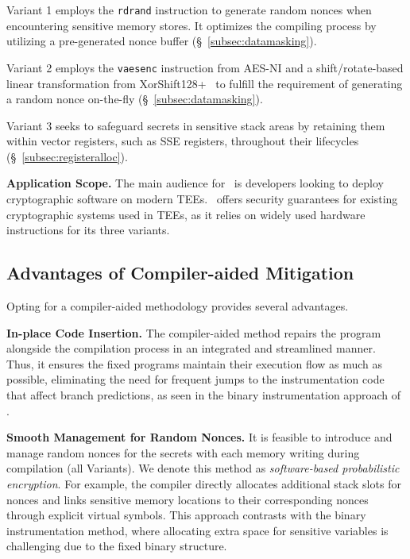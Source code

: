 \begin{packed_itemize}
    \item Variant 1 employs the \texttt{rdrand} instruction to generate random nonces when encountering sensitive memory stores. It optimizes the compiling process by utilizing a pre-generated nonce buffer (\S~\ref{subsec:datamasking}).
    
    \item Variant 2 employs the \texttt{vaesenc} instruction from AES-NI and a shift/rotate-based linear transformation from XorShift128+~\cite{vigna2017further} to fulfill the requirement of generating a random nonce on-the-fly (\S~\ref{subsec:datamasking}).
    
    \item Variant 3 seeks to safeguard secrets in sensitive stack areas by retaining them within vector registers, such as SSE registers, throughout their lifecycles (\S~\ref{subsec:registeralloc}).
\end{packed_itemize}

\noindent \textbf{Application Scope.}
The main audience for \tool\ is developers looking to deploy cryptographic software on modern TEEs. \tool\ offers security guarantees for existing cryptographic systems used in TEEs, as it relies on widely used hardware instructions for its three variants.

\subsection{Advantages of Compiler-aided Mitigation}
\label{subsec:advantages}

Opting for a compiler-aided methodology provides several advantages.

\noindent\textbf{In-place Code Insertion.}
The compiler-aided method repairs the program alongside the compilation process in an integrated and streamlined manner.
Thus, it ensures the fixed programs maintain their execution flow as much as possible, eliminating the need for frequent jumps to the instrumentation code that affect branch predictions, as seen in the binary instrumentation approach of \ftool.

\noindent\textbf{Smooth Management for Random Nonces.}
It is feasible to introduce and manage random nonces for the secrets with each memory writing during compilation (all Variants). We denote this method as \textit{software-based probabilistic encryption}. 
For example, the compiler directly allocates additional stack slots for nonces and links sensitive memory locations to their corresponding nonces through explicit virtual symbols. 
This approach contrasts with the binary instrumentation method, where allocating extra space for sensitive variables is challenging due to the fixed binary structure.

